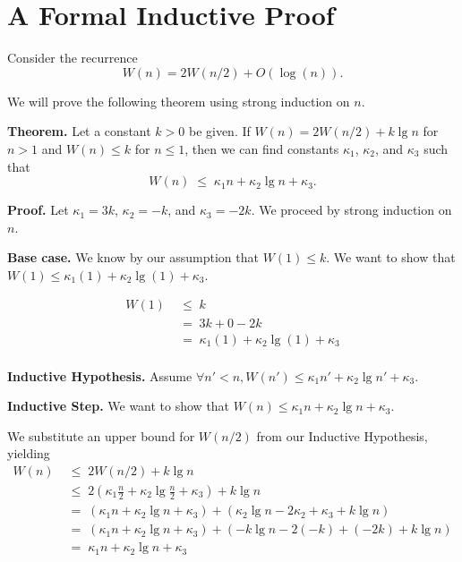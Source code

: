 \section{A Formal Inductive Proof}

\begin{example}
Consider the recurrence
  $$W(n) = 2 W(n/2) + O(\log(n)).$$

We will prove the following theorem using strong induction on $n$.

\textbf{Theorem.}
Let a constant $k > 0$ be given.  If $W(n) = 2 W(n/2) + k \lg n$ for $n >
1$ and $W(n) \leq k$ for $n \leq 1$, then we can find constants $\kappa_1$,
$\kappa_2$, and $\kappa_3$ such that \[ W(n) \;\leq\; \kappa_1 n + \kappa_2 \lg n + \kappa_3.\]

\textbf{Proof.} Let $\kappa_1 = 3k$, $\kappa_2 = -k$, and $\kappa_3 = -2k$.
We proceed by strong induction on $n$.

\textbf{Base case.} We know by our assumption that $W(1) \leq k$.
We want to show that $W(1) \leq \kappa_1 (1) + \kappa_2 \lg (1) + \kappa_3$.

\begin{align*}
W(1) \;& \leq \; k\\
      \;& = \; 3k + 0 - 2k\\
      \;& = \; \kappa_1 (1) + \kappa_2 \lg (1) + \kappa_3\\
\end{align*}

\textbf{Inductive Hypothesis.}
Assume $\forall n' < n, W(n') \leq \kappa_1 n' + \kappa_2 \lg n' + \kappa_3$.

\textbf{Inductive Step.} We want to show that $W(n) \leq \kappa_1 n + \kappa_2 \lg n + \kappa_3$.

We substitute an upper bound for $W(n/2)$ from our Inductive Hypothesis, yielding
\begin{align*}
W(n) \;& \leq \; 2 W(n/2) + k\lg n\\
     \;& \leq \; 2 \left(\kappa_1 \frac{n}{2} + \kappa_2 \lg \frac{n}{2} + \kappa_3 \right) + k \lg n\\
     \;& = \; \left(\kappa_1 n + \kappa_2 \lg n + \kappa_3 \right) + \left(\kappa_2 \lg n - 2 \kappa_2 + \kappa_3 + k \lg n \right) \\
     \;& = \; \left(\kappa_1 n + \kappa_2 \lg n + \kappa_3 \right) + \left(-k \lg n - 2 (-k) + (-2k) + k \lg n \right) \\
     \;& = \; \kappa_1 n + \kappa_2 \lg n + \kappa_3
\end{align*}
\end{example}


